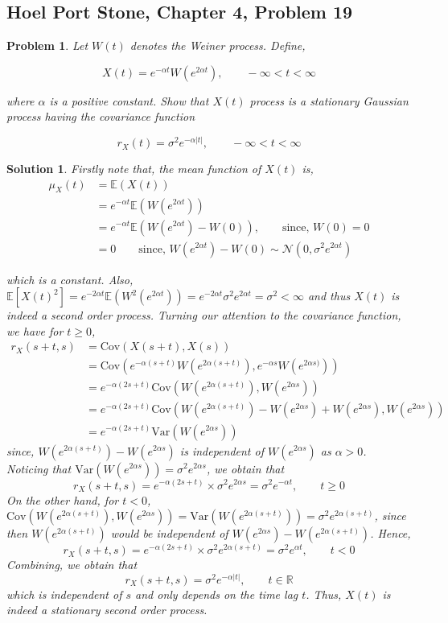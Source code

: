 \documentclass[12pt]{article}
\theoremstyle{problemstyle}
\newtheorem{pbm}{Problem}
\newtheorem*{solution*}{Solution}
\newenvironment{problem}{
\begin{tcolorbox}[colback=green!10!white,colframe=black!75!black, parbox = false]\begin{pbm} }{\end{pbm}\end{tcolorbox} }
\newcommand{\E}{\mathbb{E}}
\newcommand{\Var}{\text{Var}}
\newcommand{\Cov}{\text{Cov}}
\newcommand{\normal}{\mathcal{N}}
\newcommand{\R}{\mathbb{R}}
\begin{document}
\subsection{Hoel Port Stone, Chapter 4, Problem 19}
\begin{problem}
Let $W(t)$ denotes the Weiner process. Define, 

$$
X(t) = e^{-\alpha t} W(e^{2\alpha t}), \qquad -\infty < t < \infty
$$

\noindent where $\alpha$ is a positive constant. Show that $X(t)$ process is a stationary Gaussian process having the covariance function 

$$
r_X(t) = \sigma^2 e^{-\alpha \vert t \vert}, \qquad -\infty < t < \infty
$$

\end{problem}
\begin{solution*}

Firstly note that, the mean function of $X(t)$ is,
\begin{align*}
    \mu_X(t)
    & = \E(X(t)) \\
    & = e^{-\alpha t} \E(W(e^{2\alpha t}))\\
    & = e^{-\alpha t} \E(W(e^{2\alpha t}) - W(0)), \qquad \text{since, } W(0) = 0\\
    & = 0 \qquad \text{since, } W(e^{2\alpha t}) - W(0) \sim \normal\left(0, \sigma^2 e^{2\alpha t}\right)
\end{align*}

which is a constant. Also, $\E[X(t)^2] = e^{-2\alpha t}\E(W^2(e^{2\alpha t})) = e^{-2\alpha t}\sigma^2e^{2\alpha t} = \sigma^2<\infty$ and thus $X(t)$ is indeed a second order process. Turning our attention to the covariance function, we have for $t \geq 0$, 
\begin{align*}
    r_X(s+t, s)
    & = \Cov(X(s+t), X(s))\\
    & = \Cov\left( e^{-\alpha (s+t)} W(e^{2\alpha (s+t)}), e^{-\alpha s} W(e^{2\alpha s)}) \right)\\
    & = e^{-\alpha(2s + t)} \Cov(W(e^{2\alpha (s+t)}), W(e^{2\alpha s}))\\
    & = e^{-\alpha(2s + t)} \Cov(W(e^{2\alpha (s+t)}) - W(e^{2\alpha s}) + W(e^{2\alpha s}), W(e^{2\alpha s}))\\
    & = e^{-\alpha(2s + t)} \Var(W(e^{2\alpha s}))
\end{align*}
\noindent since, $W(e^{2\alpha (s+t)}) - W(e^{2\alpha s})$ is independent of $W(e^{2\alpha s})$ as $\alpha > 0$. Noticing that $\Var(W(e^{2\alpha s})) = \sigma^2 e^{2\alpha s}$, we obtain that 
$$
r_X(s+t, s) = e^{-\alpha(2s + t)} \times \sigma^2 e^{2\alpha s} = \sigma^2 e^{-\alpha t}, \qquad t \geq 0
$$
On the other hand, for $t < 0$, $\Cov(W(e^{2\alpha (s+t)}), W(e^{2\alpha s})) = \Var(W(e^{2\alpha (s+t)}) ) = \sigma^2 e^{2\alpha (s + t)}$, since then $W(e^{2\alpha (s+t)})$ would be independent of $W(e^{2\alpha s}) - W(e^{2\alpha (s+t)})$. Hence, 
$$
r_X(s+t, s) = e^{-\alpha(2s + t)} \times \sigma^2 e^{2\alpha (s+t)} = \sigma^2 e^{\alpha t}, \qquad t < 0
$$
\noindent Combining, we obtain that
$$
r_X(s+t, s) = \sigma^2 e^{-\alpha \vert t\vert}, \qquad t \in \R
$$
\noindent which is independent of $s$ and only depends on the time lag $t$. Thus, $X(t)$ is indeed a stationary second order process. 


\end{solution*}
\end{document}
